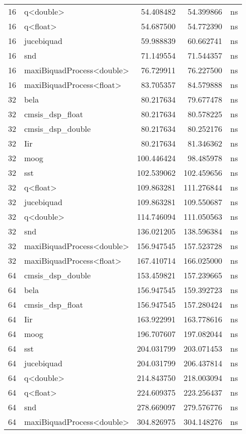 \begin{tabular}{rlrrl}
16 & q<double> & 54.408482 & 54.399866 & ns \\
16 & q<float> & 54.687500 & 54.772390 & ns \\
16 & jucebiquad & 59.988839 & 60.662741 & ns \\
16 & snd & 71.149554 & 71.544357 & ns \\
16 & maxiBiquadProcess<double> & 76.729911 & 76.227500 & ns \\
16 & maxiBiquadProcess<float> & 83.705357 & 84.579888 & ns \\
32 & bela & 80.217634 & 79.677478 & ns \\
32 & cmsis\_dsp\_float & 80.217634 & 80.578225 & ns \\
32 & cmsis\_dsp\_double & 80.217634 & 80.252176 & ns \\
32 & Iir & 80.217634 & 81.346362 & ns \\
32 & moog & 100.446424 & 98.485978 & ns \\
32 & sst & 102.539062 & 102.459656 & ns \\
32 & q<float> & 109.863281 & 111.276844 & ns \\
32 & jucebiquad & 109.863281 & 109.550687 & ns \\
32 & q<double> & 114.746094 & 111.050563 & ns \\
32 & snd & 136.021205 & 138.596384 & ns \\
32 & maxiBiquadProcess<double> & 156.947545 & 157.523728 & ns \\
32 & maxiBiquadProcess<float> & 167.410714 & 166.025000 & ns \\
64 & cmsis\_dsp\_double & 153.459821 & 157.239665 & ns \\
64 & bela & 156.947545 & 159.392723 & ns \\
64 & cmsis\_dsp\_float & 156.947545 & 157.280424 & ns \\
64 & Iir & 163.922991 & 163.778616 & ns \\
64 & moog & 196.707607 & 197.082044 & ns \\
64 & sst & 204.031799 & 203.071453 & ns \\
64 & jucebiquad & 204.031799 & 206.437814 & ns \\
64 & q<double> & 214.843750 & 218.003094 & ns \\
64 & q<float> & 224.609375 & 223.256437 & ns \\
64 & snd & 278.669097 & 279.576776 & ns \\
64 & maxiBiquadProcess<double> & 304.826975 & 304.148276 & ns \\

\end{tabular}
